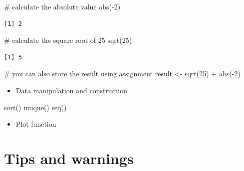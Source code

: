 \documentclass[
  letterpaper,
  DIV=11,
  numbers=noendperiod]{scrreprt}
\newenvironment{Shaded}{\begin{snugshade}}{\end{snugshade}}
\newcommand{\CommentTok}[1]{\textcolor[rgb]{0.37,0.37,0.37}{#1}}
\newcommand{\DecValTok}[1]{\textcolor[rgb]{0.68,0.00,0.00}{#1}}
\newcommand{\FunctionTok}[1]{\textcolor[rgb]{0.28,0.35,0.67}{#1}}
\newcommand{\NormalTok}[1]{\textcolor[rgb]{0.00,0.23,0.31}{#1}}
\newcommand{\OtherTok}[1]{\textcolor[rgb]{0.00,0.23,0.31}{#1}}
\newcommand{\SpecialCharTok}[1]{\textcolor[rgb]{0.37,0.37,0.37}{#1}}
\providecommand{\tightlist}{%
  \setlength{\itemsep}{0pt}\setlength{\parskip}{0pt}}
\begin{document}
\begin{Shaded}
\begin{Highlighting}[]
\CommentTok{\# calculate the absolute value}
\FunctionTok{abs}\NormalTok{(}\SpecialCharTok{{-}}\DecValTok{2}\NormalTok{)}
\end{Highlighting}
\end{Shaded}

\begin{verbatim}
[1] 2
\end{verbatim}

\begin{Shaded}
\begin{Highlighting}[]
\CommentTok{\# calculate the square root of 25}
\FunctionTok{sqrt}\NormalTok{(}\DecValTok{25}\NormalTok{)}
\end{Highlighting}
\end{Shaded}

\begin{verbatim}
[1] 5
\end{verbatim}

\begin{Shaded}
\begin{Highlighting}[]
\CommentTok{\# you can also store the result using assignment}
\NormalTok{result }\OtherTok{\textless{}{-}} \FunctionTok{sqrt}\NormalTok{(}\DecValTok{25}\NormalTok{) }\SpecialCharTok{+} \FunctionTok{abs}\NormalTok{(}\SpecialCharTok{{-}}\DecValTok{2}\NormalTok{)}
\end{Highlighting}
\end{Shaded}

\begin{itemize}
\tightlist
\item
  Data manipulation and construction
\end{itemize}

\begin{Shaded}
\begin{Highlighting}[]
    \FunctionTok{sort}\NormalTok{()}
    \FunctionTok{unique}\NormalTok{()}
    \FunctionTok{seq}\NormalTok{()}
\end{Highlighting}
\end{Shaded}

\begin{itemize}
\tightlist
\item
  Plot function
\end{itemize}

\section*{Tips and warnings}\label{tips-and-warnings-32}
\end{document}
